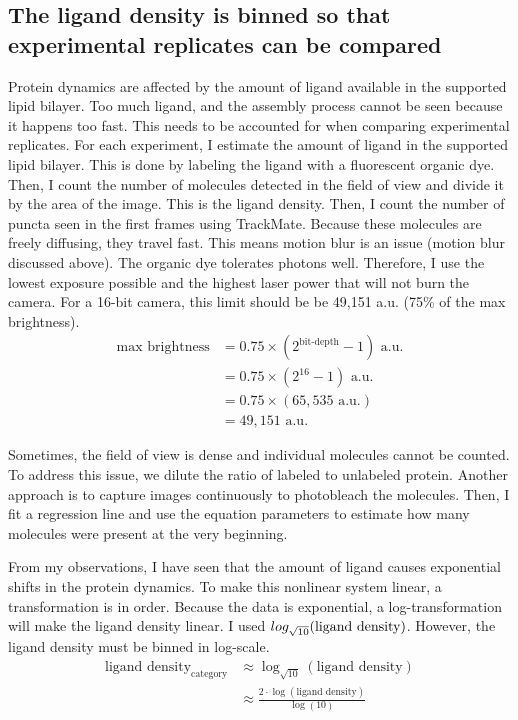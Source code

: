 \subsection{The ligand density is binned so that experimental replicates can be compared}
Protein dynamics are affected by the amount of ligand available in the supported lipid bilayer. Too much ligand, and the assembly process cannot be seen because it happens too fast. This needs to be accounted for when comparing experimental replicates. For each experiment, I estimate the amount of ligand in the supported lipid bilayer. This is done by labeling the ligand with a fluorescent organic dye. Then, I count the number of molecules detected in the field of view and divide it by the area of the image. This is the ligand density. Then, I count the number of puncta seen in the first frames using TrackMate. Because these molecules are freely diffusing, they travel fast. This means motion blur is an issue (motion blur discussed above). The organic dye tolerates photons well. Therefore, I use the lowest exposure possible and the highest laser power that will not burn the camera. For a 16-bit camera, this limit should be be 49,151 a.u. (75\% of the max brightness).
\begin{equation*}
\begin{aligned}
\text{max brightness} &= 0.75 \times (2^\text{bit-depth} - 1)\text{ a.u.} \\
& = 0.75 \times(2^{16}-1)\text{ a.u.} \\
& = 0.75 \times (65,535\text{ a.u.}) \\
& = 49,151\text{ a.u.}
\end{aligned}
\end{equation*}

Sometimes, the field of view is dense and individual molecules cannot be counted. To address this issue, we dilute the ratio of labeled to unlabeled protein. Another approach is to capture images continuously to photobleach the molecules. Then, I fit a regression line and use the equation parameters to estimate how many molecules were present at the very beginning. 

From my observations, I have seen that the amount of ligand causes exponential shifts in the protein dynamics. To make this nonlinear system linear, a transformation is in order. Because the data is exponential, a log-transformation will make the ligand density linear. I used $\\log_{\sqrt{10}}(\text{ligand density})$. However, the ligand density must be binned in log-scale.
\begin{equation*}
\begin{aligned}
\text{ligand density}_\text{category} &\approx \log_{\sqrt{10}}(\text{ligand density})\\
&\approx \frac{2 \cdot \log(\text{ligand density})}{\log(10)}
\end{aligned}
\end{equation*}

